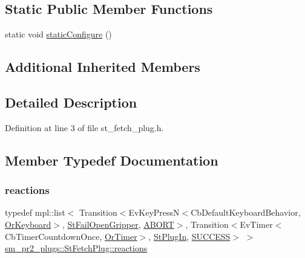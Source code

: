 \subsection*{Static Public Member Functions}
\begin{DoxyCompactItemize}
\item 
static void \hyperlink{structsm__pr2__plugs_1_1StFetchPlug_a61bddcfc32e45d16b7b6b6e637f328cc}{static\+Configure} ()
\end{DoxyCompactItemize}
\subsection*{Additional Inherited Members}


\subsection{Detailed Description}


Definition at line 3 of file st\+\_\+fetch\+\_\+plug.\+h.



\subsection{Member Typedef Documentation}
\mbox{\label{structsm__pr2__plugs_1_1StFetchPlug_a419655234103a8527bd89d0a02e1f0c0}} 
\subsubsection{\texorpdfstring{reactions}{reactions}}
{\footnotesize\ttfamily typedef mpl\+::list$<$ Transition$<$Ev\+Key\+PressN$<$Cb\+Default\+Keyboard\+Behavior, \hyperlink{classsm__pr2__plugs_1_1OrKeyboard}{Or\+Keyboard}$>$, \hyperlink{structsm__pr2__plugs_1_1StFailOpenGripper}{St\+Fail\+Open\+Gripper}, \hyperlink{classABORT}{A\+B\+O\+RT}$>$, Transition$<$Ev\+Timer$<$Cb\+Timer\+Countdown\+Once, \hyperlink{classsm__pr2__plugs_1_1OrTimer}{Or\+Timer}$>$, \hyperlink{structsm__pr2__plugs_1_1StPlugIn}{St\+Plug\+In}, \hyperlink{classSUCCESS}{S\+U\+C\+C\+E\+SS}$>$ $>$ \hyperlink{structsm__pr2__plugs_1_1StFetchPlug_a419655234103a8527bd89d0a02e1f0c0}{sm\+\_\+pr2\+\_\+plugs\+::\+St\+Fetch\+Plug\+::reactions}}



